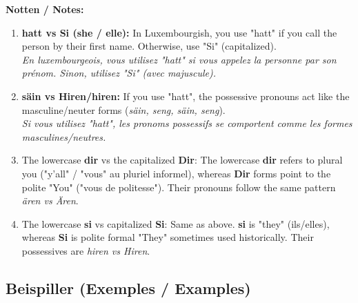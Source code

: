 \textbf{Notten / Notes:}
\begin{enumerate}
    \item \textbf{hatt vs Si (she / elle):} In Luxembourgish, you use "hatt" if you call the person by their first name. Otherwise, use "Si" (capitalized). \\
    \textit{En luxembourgeois, vous utilisez "hatt" si vous appelez la personne par son prénom. Sinon, utilisez "Si" (avec majuscule).}
    \item \textbf{säin vs Hiren/hiren:} If you use "hatt", the possessive pronouns act like the masculine/neuter forms (\textit{säin, seng, säin, seng}).  \\
    \textit{Si vous utilisez "hatt", les pronoms possessifs se comportent comme les formes masculines/neutres.}
    \item The lowercase \textbf{dir} vs the capitalized \textbf{Dir}: The lowercase \textbf{dir} refers to plural you ("y'all" / "vous" au pluriel informel), whereas \textbf{Dir} forms point to the polite "You" ("vous de politesse"). Their pronouns follow the same pattern \textit{ären vs Ären}.
    \item The lowercase \textbf{si} vs capitalized \textbf{Si}: Same as above. \textbf{si} is "they" (ils/elles), whereas \textbf{Si} is polite formal "They" sometimes used historically. Their possessives are \textit{hiren vs Hiren}.
\end{enumerate}

\subsection*{Beispiller (Exemples / Examples)}

